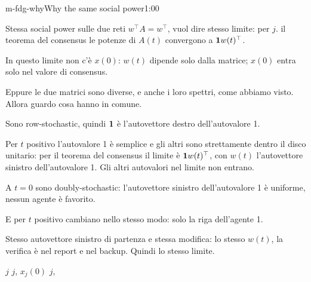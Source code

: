 \begin{slide}{m-fdg-why}{Why the same social power}{1:00 {\color{red}}}
  \begin{discorso}
    \item {\color{red}  } {\color{blue}Stessa} social power {\color{red}} {\color{blue}sulle} due reti {\color{red}       } {\color{red}$w^\top A=w^\top$,} {\color{red}} {\color{blue}vuol dire stesso limite:} per {\color{red}} {\color{red}$j$.} {\color{blue}il teorema del consensus le potenze di $A(t)$ convergono a $\mathbf{1} w(t)^\top$.}
    \item {\color{blue}In questo limite non c'è $x(0)$: $w(t)$ dipende solo dalla matrice; $x(0)$ entra solo nel valore di consensus.}
    \item {\color{blue}Eppure le due matrici sono diverse, e anche i loro spettri, come abbiamo visto. Allora guardo cosa hanno in comune.}
    \item {\color{blue}Sono row-stochastic, quindi $\mathbf{1}$ è l'autovettore destro dell'autovalore 1.}
    \item {\color{blue}Per $t$ positivo l'autovalore 1 è semplice e gli altri sono strettamente dentro il disco unitario: per il teorema del consensus il limite è $\mathbf{1} w(t)^\top$, con $w(t)$ l'autovettore sinistro dell'autovalore 1. Gli altri autovalori nel limite non entrano.}
    \item {\color{blue}A $t=0$ sono doubly-stochastic: l'autovettore sinistro dell'autovalore 1 è uniforme, nessun agente è favorito.}
    \item {\color{blue}E per $t$ positivo cambiano nello stesso modo: solo la riga dell'agente 1.}
    \item {\color{blue}Stesso autovettore sinistro di partenza e stessa modifica: lo stesso $w(t)$, la verifica è nel report e nel backup. Quindi lo stesso limite.}
    \item {\color{red}    } {\color{red}$j$} {\color{red}          } {\color{red}$j$,} {\color{red}                 } {\color{red}$x_j(0)$} {\color{red}       } {\color{red}$j$,} {\color{red}            }

\end{discorso}
\end{slide}
